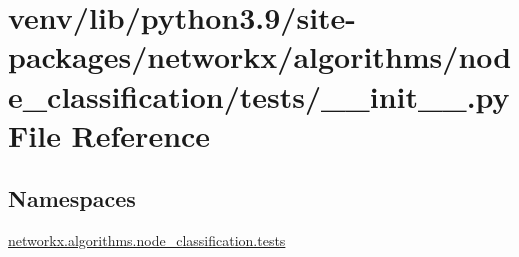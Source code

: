 \hypertarget{venv_2lib_2python3_89_2site-packages_2networkx_2algorithms_2node__classification_2tests_2____init_____8py}{}\section{venv/lib/python3.9/site-\/packages/networkx/algorithms/node\+\_\+classification/tests/\+\_\+\+\_\+init\+\_\+\+\_\+.py File Reference}
\label{venv_2lib_2python3_89_2site-packages_2networkx_2algorithms_2node__classification_2tests_2____init_____8py}
\subsection*{Namespaces}
\begin{DoxyCompactItemize}
\item 
 \hyperlink{namespacenetworkx_1_1algorithms_1_1node__classification_1_1tests}{networkx.\+algorithms.\+node\+\_\+classification.\+tests}
\end{DoxyCompactItemize}
